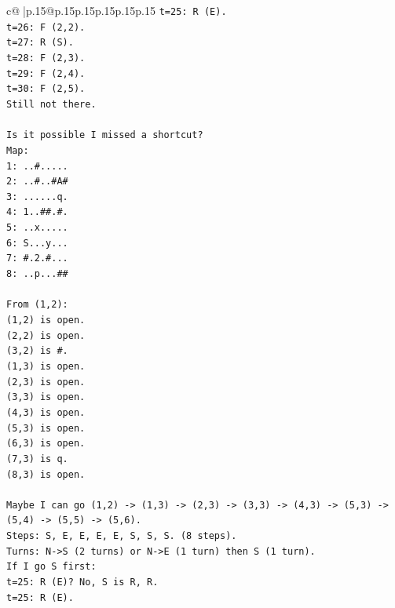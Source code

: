 \documentclass{article}
\begin{document}
{\begin{supertabular}{c@{$\;$}|p{.15\linewidth}@{}p{.15\linewidth}p{.15\linewidth}p{.15\linewidth}p{.15\linewidth}p{.15\linewidth}}
{{{\texttt{t=25: R (E).} \\
\texttt{t=26: F (2,2).} \\
\texttt{t=27: R (S).} \\
\texttt{t=28: F (2,3).} \\
\texttt{t=29: F (2,4).} \\
\texttt{t=30: F (2,5).} \\
\texttt{Still not there.} \\
\\ 
\texttt{Is it possible I missed a shortcut?} \\
\texttt{Map:} \\
\texttt{1: ..\#.....} \\
\texttt{2: ..\#..\#A\#} \\
\texttt{3: ......q.} \\
\texttt{4: 1..\#\#.\#.} \\
\texttt{5: ..x.....} \\
\texttt{6: S...y...} \\
\texttt{7: \#.2.\#...} \\
\texttt{8: ..p...\#\#} \\
\\ 
\texttt{From (1,2):} \\
\texttt{(1,2) is open.} \\
\texttt{(2,2) is open.} \\
\texttt{(3,2) is \#.} \\
\texttt{(1,3) is open.} \\
\texttt{(2,3) is open.} \\
\texttt{(3,3) is open.} \\
\texttt{(4,3) is open.} \\
\texttt{(5,3) is open.} \\
\texttt{(6,3) is open.} \\
\texttt{(7,3) is q.} \\
\texttt{(8,3) is open.} \\
\\ 
\texttt{Maybe I can go (1,2) {-}> (1,3) {-}> (2,3) {-}> (3,3) {-}> (4,3) {-}> (5,3) {-}> (5,4) {-}> (5,5) {-}> (5,6).} \\
\texttt{Steps: S, E, E, E, E, S, S, S. (8 steps).} \\
\texttt{Turns: N{-}>S (2 turns) or N{-}>E (1 turn) then S (1 turn).} \\
\texttt{If I go S first:} \\
\texttt{t=25: R (E)? No, S is R, R.} \\
\texttt{t=25: R (E).} \\
}}}
\end{supertabular}}
\end{document}
